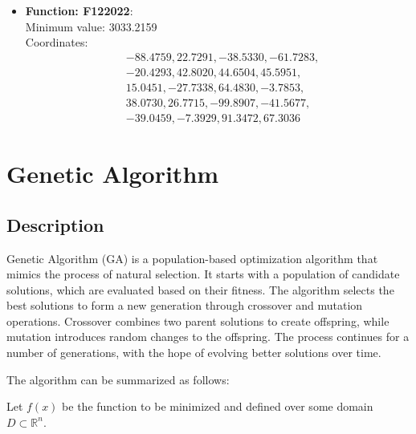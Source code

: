 \documentclass{article}
\begin{document}
\begin{itemize}
  \item \textbf{Function: F122022}: \\
    Minimum value: 3033.2159 \\
    Coordinates:
    \[
      \begin{aligned}
        & -88.4759, 22.7291, -38.5330, -61.7283, \\
        & -20.4293, 42.8020, 44.6504, 45.5951, \\
        & 15.0451, -27.7338, 64.4830, -3.7853, \\
        & 38.0730, 26.7715, -99.8907, -41.5677, \\
        & -39.0459, -7.3929, 91.3472, 67.3036
      \end{aligned}
    \]

\end{itemize}

\section{Genetic Algorithm}

\subsection{Description}

Genetic Algorithm (GA) is a population-based optimization algorithm
that mimics the process of natural selection. It starts with a
population of candidate solutions, which are evaluated based on their
fitness. The algorithm selects the best solutions to form a new
generation through crossover and mutation operations. Crossover combines
two parent solutions to create offspring, while mutation introduces
random changes to the offspring. The process continues for a number of
generations, with the hope of evolving better solutions over time.

The algorithm can be summarized as follows:

Let $f(x)$ be the function to be minimized and defined over some domain
$D \subset \mathbb{R}^n$.
\end{document}

